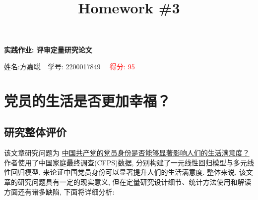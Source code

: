 \documentclass[11pt]{article}
\title{Homework \#3}
\newcommand\1{\mathds{1}}
\begin{document}
\pagestyle{fancy}
\chead{}
\fancyfoot[C]{\thepage\ /\ \pageref{LastPage} \\ \textcolor{lightgray}{最后编译时间: \today}}



\begin{center}
    {\LARGE \bf 实践作业: 评审定量研究论文}

    {姓名:方嘉聪\ \  学号: 2200017849 \ \ \textcolor{red}{得分: 95}}            %
\end{center}

\section{党员的生活是否更加幸福？}

\subsection{研究整体评价}
    该文章研究问题为 \underline{中国共产党的党员身份是否能够显著影响人们的生活满意度？} 作者使用了中国家庭最终调查(CFPS)数据, 
    分别构建了一元线性回归模型与多元线性回归模型, 来论证中国党员身份可以显著提升人们的生活满意度. 整体来说, 该文章的研究问题具有一定的现实意义,
    但在定量研究设计细节、统计方法使用和解读方面还有诸多缺陷, 下面将详细分析:
\end{document}

